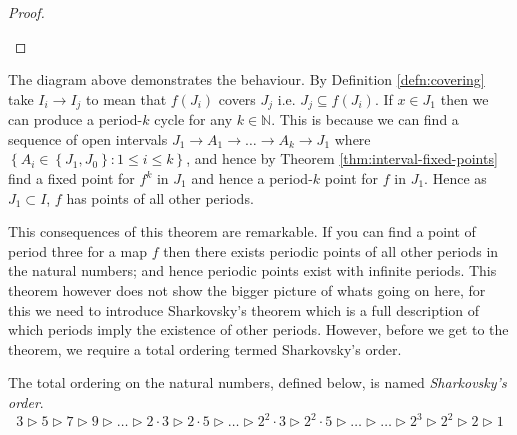 \begin{thm}
\begin{proof}
        \begin{center}
        \end{center}

    \end{proof}

\end{thm}
The diagram above demonstrates the behaviour. By Definition \ref{defn:covering} take $I_i \to I_j$ to mean that $f(J_i)$ covers $J_j$ i.e. $J_j \subseteq f(J_i)$. If $x \in J_1$ then we can produce a period-$k$ cycle for any $k \in \mathbb{N}$. This is because we can find a sequence of open intervals $J_1 \to A_1 \to \dots \to A_k \to J_1$ where $\left\lbrace A_i \in \left\lbrace J_1, J_0 \right\rbrace : 1 \leq i \leq k \right\rbrace$, and hence by Theorem \ref{thm:interval-fixed-points} find a fixed point for $f^k$ in $J_1$ and hence a period-$k$ point for $f$ in $J_1$. Hence as $J_1 \subset I$, $f$ has points of all other periods.

This consequences of this theorem are remarkable. If you can find a point of period three for a map $f$ then there exists periodic points of all other periods in the natural numbers; and hence periodic points exist with infinite periods. This theorem however does not show the bigger picture of whats going on here, for this we need to introduce Sharkovsky's theorem which is a full description of which periods imply the existence of other periods. However, before we get to the theorem, we require a total ordering termed Sharkovsky's order.

\begin{defn}
    The total ordering on the natural numbers, defined below, is named \emph{Sharkovsky's order}. \[ 3 \rhd 5 \rhd 7 \rhd 9 \rhd \dots \rhd 2 \cdot 3 \rhd 2 \cdot 5 \rhd \dots \rhd 2^2 \cdot 3 \rhd 2^2 \cdot 5 \rhd \dots \rhd \dots \rhd 2^3 \rhd 2^2 \rhd 2 \rhd 1 \]
\end{defn}

